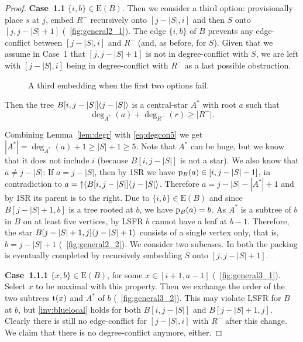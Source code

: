 \documentclass[11pt,a4paper,colorlinks=true,urlcolor=blue,citecolor=red]{article}
\theoremstyle{plain}
\newcommand{\case}[1]{\par\vspace{.5\baselineskip}\noindent\textbf{\sffamily Case~#1}}
\newcommand{\EB}{\mathrm{E}(B)}
\begin{document}
\begin{proof}
  \case{1.1} $\{i,b\}\in\EB$. Then we consider a third option:
  provisionally place $s$ at $j$, embed $R^-$ recursively onto $[j-|S|,i]$ and then $S$ onto $[j,j-|S|+1]$ (\figurename~\ref{fig:general2_1}). The edge
  $\{i,b\}$ of $B$ prevents any edge-conflict between $[j-|S|,i]$ and
  $R^-$ (and, as before, for $S$). Given that we assume in Case~1 that
  $[j,j-|S|+1]$ is not in degree-conflict with $S$, we are left with
  $[j-|S|,i]$ being in degree-conflict with $R^-$ as a last possible
  obstruction.
\begin{figure}[htbp]
    \centering\hfil {}\hfil
    \hfil
    \caption{A third embedding when the first two options
      fail.\label{fig:general2}}
  \end{figure}


\noindent
  Then the tree $B{[i,j-|S|]}\langle{j-|S|}\rangle$ is a central-star $A^*$
  with root $a$ such that
\begin{equation}\label{eq:degcon5}
    \deg_{A^*}(a)+\deg_{R^-}(r)\ge|R^-|.
  \end{equation}


  \noindent
  Combining Lemma~\ref{lem:degr} with \eqref{eq:degcon5} we get
$|A^*|=\deg_{A^*}(a)+1\ge|S|+1\ge 5$. Note that $A^*$ can be huge, but
  we know that it does not include $i$ (because $B[i,j-|S|]$ is not a
  star). We also know that $a\ne j-|S|$:
If $a= j-|S|$, then by 1SR we have
$\mathrm p_B(a)\in [i,j-|S|-1]$, in contradiction to
  $a=\mathop{\uparrow}(B{[i,j-|S|]}\langle{j-|S|}\rangle$. Therefore $a=j-|S|-|A^*|+1$
  and by 1SR its parent is to the right. Due to $\{i,b\}\in\EB$ and
  since $B[j-|S|+1,b]$ is a tree rooted at $b$, we have $\mathrm p_B(a)=b$. As
  $A^*$ is a subtree of $b$ in $B$ on at least five vertices, by LSFR
  $b$ cannot have a leaf at $b-1$. Therefore, the star
  $B{[j-|S|+1,j]}\langle{j-|S|+1}\rangle$ consists of a single vertex only,
  that is, $b=j-|S|+1$ (\figurename~\ref{fig:general2_2}). We consider
  two subcases.
In both the packing is eventually completed by recursively embedding $S$ onto
  $[j,j-|S|+1]$.

  \case{1.1.1} $\{x,b\}\in\EB$, for some $x\in[i+1,a-1]$
  (\figurename~\ref{fig:general3_1}). Select $x$ to be maximal with this
  property. Then we exchange the order of the two subtrees $\mathrm t(x)$ and
  $A^*$ of $b$ (\figurename~\ref{fig:general3_2}). This may violate LSFR
  for $B$ at $b$, but \ref{inv:bluelocal} holds for both $B[i,j-|S|]$
  and $B[j-|S|+1,j]$.
Clearly there is still no edge-conflict for $[j-|S|,i]$ with $R^-$
  after this change. We claim that there is no degree-conflict anymore,
  either.


\end{proof}
\end{document}
